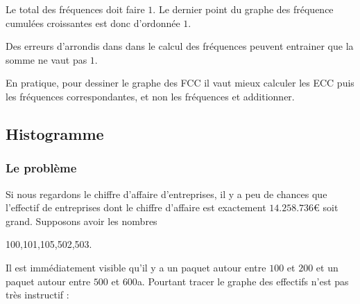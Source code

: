 \begin{center}

\end{center}

\begin{remark}
    Le total des fréquences doit faire \( 1\). Le dernier point du graphe des fréquence cumulées croissantes est donc d'ordonnée \( 1\).

    Des erreurs d'arrondis dans dans le calcul des fréquences peuvent entrainer que la somme ne vaut pas \( 1\).

    En pratique, pour dessiner le graphe des FCC il vaut mieux calculer les ECC puis les fréquences correspondantes, et non les fréquences et additionner.

\end{remark}

\subsection{Histogramme}


\subsubsection{Le problème}

Si nous regardons le chiffre d'affaire d'entreprises, il y a peu de chances que l'effectif de entreprises dont le chiffre d'affaire est exactement \( 14.258.736\)€ soit grand. Supposons avoir les nombres
\begin{center}
    100,101,105,502,503.
\end{center}
Il est immédiatement visible qu'il y a un paquet autour entre \( 100\) et \( 200\) et un paquet autour entre \( 500\) et \( 600\)a. Pourtant tracer le graphe des effectifs n'est pas très instructif :
\begin{center}
   
\end{center}

